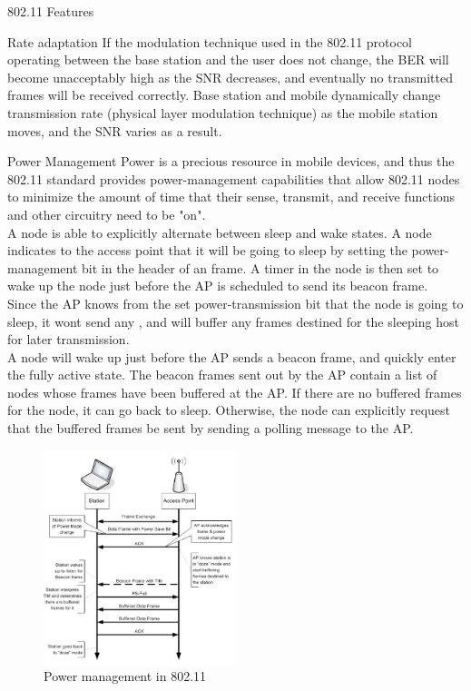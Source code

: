 \begin{section}{802.11 Features}
\begin{subsection}{Rate adaptation}
    If the modulation technique used in the 802.11 protocol operating between the base
    station and the user does not change, the BER will become unacceptably high as the
    SNR decreases, and eventually no transmitted frames will be received correctly.
    Base station and mobile dynamically change transmission rate (physical layer modulation technique) 
    as the mobile station moves, and the SNR varies as a result.
  \end{subsection}
  \begin{subsection}{Power Management}
    Power is a precious resource in mobile devices, and thus the 802.11 standard provides 
    power-management capabilities that allow 802.11 nodes to minimize the amount of time that 
    their sense, transmit, and receive functions and other circuitry need to be "on".\\
    A node is able to explicitly alternate between sleep and wake states. A node indicates to the 
    access point that it will be going to sleep by setting the power-management bit in the header 
    of an frame. A timer in the node is then set to wake up the node just before the AP is 
    scheduled to send its beacon frame.\\
    Since the AP knows from the set power-transmission bit that the node is going to sleep, it wont send any
    , and will buffer any frames destined for the sleeping host for later transmission.\\
    A node will wake up just before the AP sends a beacon frame, and quickly enter the fully active 
    state.
    The beacon frames sent out by the AP contain a list of nodes whose frames have been buffered 
    at the AP. If there are no buffered frames for the node, it can go back to sleep. Otherwise, 
    the node can explicitly request that the buffered frames be sent by sending a polling message 
    to the AP.

    \begin{figure}[h]
      \centering
      \includegraphics[width=0.5\textwidth]{img/wireless/80211 power saving.png}
      \caption{Power management in 802.11}
    \end{figure}

  \end{subsection}

\end{section}
